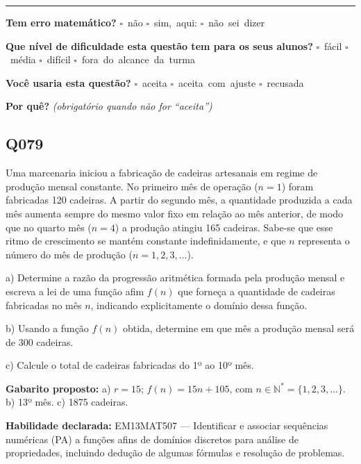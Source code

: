 \documentclass[11pt,a4paper]{article}
\begin{document}
\noindent\rule{\linewidth}{0.4pt}
\textbf{Tem erro matemático?}\quad
\mbox{$\square$~não} \quad \mbox{$\square$~sim, aqui:} \underline{\hspace{5cm}}
\quad \mbox{$\square$~não sei dizer}

\textbf{Que nível de dificuldade esta questão tem para os seus alunos?}\quad
\mbox{$\square$~fácil} \quad \mbox{$\square$~média} \quad
\mbox{$\square$~difícil} \quad \mbox{$\square$~fora do alcance da turma}

\textbf{Você usaria esta questão?}\quad
\mbox{$\square$~aceita} \quad \mbox{$\square$~aceita com ajuste} \quad
\mbox{$\square$~recusada}

\textbf{Por quê?} \emph{(obrigatório quando não for ``aceita'')}

\underline{\hspace{\linewidth}}

\underline{\hspace{\linewidth}}
\vspace{0.6em}

\begin{samepage}
\subsection*{Q079}
Uma marcenaria iniciou a fabricação de cadeiras artesanais em regime de produção mensal constante. No primeiro mês de operação ($n=1$) foram fabricadas 120 cadeiras. A partir do segundo mês, a quantidade produzida a cada mês aumenta sempre do mesmo valor fixo em relação ao mês anterior, de modo que no quarto mês ($n=4$) a produção atingiu 165 cadeiras. Sabe-se que esse ritmo de crescimento se mantém constante indefinidamente, e que $n$ representa o número do mês de produção ($n = 1, 2, 3, \dots$).

a) Determine a razão da progressão aritmética formada pela produção mensal e escreva a lei de uma função afim $f(n)$ que forneça a quantidade de cadeiras fabricadas no mês $n$, indicando explicitamente o domínio dessa função.

b) Usando a função $f(n)$ obtida, determine em que mês a produção mensal será de 300 cadeiras.

c) Calcule o total de cadeiras fabricadas do 1º ao 10º mês.

\textbf{Gabarito proposto:} a) $r = 15$; $f(n) = 15n + 105$, com $n \in \mathbb{N}^* = \{1,2,3,\dots\}$. b) 13º mês. c) 1875 cadeiras.

\textbf{Habilidade declarada:} EM13MAT507 --- Identificar e associar sequências numéricas (PA) a funções afins de domínios discretos para análise de propriedades, incluindo dedução de algumas fórmulas e resolução de problemas.
\end{samepage}
\end{document}
